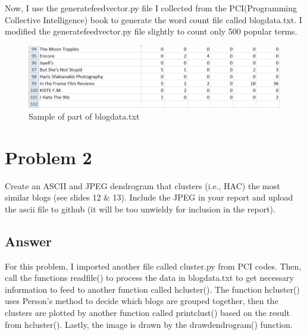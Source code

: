\documentclass[12pt]{article}
\begin{document}


Now, I use the generatefeedvector.py file I collected from the PCI(Programming Collective Intelligence) book to generate the word count file called blogdata.txt. I modified the generatefeedvector.py file slightly to count only 500 popular terms. 

\begin{figure}[h]
\centering
\includegraphics[width=6.5in]{blogdata.png}
\caption{Sample of part of blogdata.txt}
\end{figure}



\section*{Problem 2}

Create an ASCII and JPEG dendrogram that clusters (i.e., HAC)
the most similar blogs (see slides 12 \& 13).  Include the JPEG in
your report and upload the ascii file to github (it will be too
unwieldy for inclusion in the report).

\subsection*{Answer}
For this problem, I imported another file called cluster.py from PCI codes. Then, call the functions readfile() to process the data in blogdata.txt to get necessary information to feed to another function called hcluster(). The function hcluster() uses Person's method to decide which blogs are grouped together, then the clusters are plotted  by another function called printclust() based on the result from hcluster(). Lastly, the image is drawn by the drawdendrogram() function. 



\end{document}
